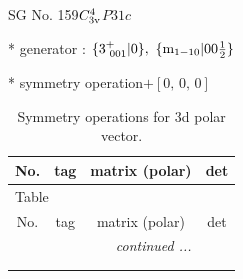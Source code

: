 \documentclass[fleqn,8pt]{jsarticle}
\begin{document}
\setcounter{MaxMatrixCols}{32}

\renewcommand{\tablename}{Table~}
\renewcommand{\figurename}{Figure~}
\begin{center}
\LARGE
SG No. 159\quad$C_{\rm 3v}^{4}$\quad$P31c$\quad[ trigonal ]
\end{center}

* generator : $\{3^{+}_{\,\,001}|0\},\,\,\{{\rm m}_{1-10}|0 0 \frac{1}{2}\}$

* symmetry operation\quad$+\left[ 0,\, 0,\, 0 \right]$
\renewcommand{\arraystretch}{1.3}
\begin{longtable}{cccc}
\caption{Symmetry operations for 3d polar vector.}
 \\
 \hline \hline
No. & tag & matrix (polar) & det \\ \hline \endfirsthead

\multicolumn{3}{l}{\tablename\ \thetable{}} \\
 \hline \hline
No. & tag & matrix (polar) & det \\ \hline \endhead

 \hline \hline
\multicolumn{3}{r}{\footnotesize\it continued ...} \\ \endfoot

 \hline \hline
\multicolumn{3}{r}{} \\ \endlastfoot


\end{longtable}
\end{document}
